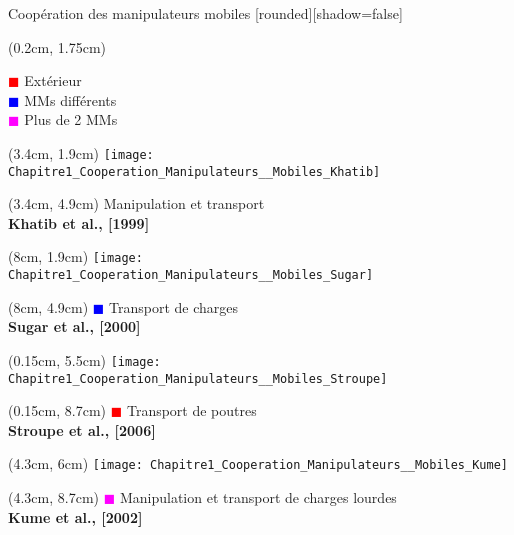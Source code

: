 \documentclass[french]{beamer}
\begin{document}
\begin{frame}{Coopération des manipulateurs mobiles}
[rounded][shadow=false]
{\scriptsize 
\begin{textblock*}{3cm}(0.2cm, 1.75cm) %
\begin{block}{} %
\textcolor{red}{$\blacksquare$} Extérieur\\
\textcolor{blue}{$\blacksquare$} MMs différents\\
\textcolor{magenta}{$\blacksquare$} Plus de 2 MMs
 \end{block}
\end{textblock*}
}
\begin{textblock*}{3.75cm}(3.4cm, 1.9cm)
\centering
\texttt{[image: Chapitre1\_Cooperation\_Manipulateurs\_\_Mobiles\_Khatib]}
\end{textblock*}
\begin{textblock*}{3.75cm}(3.4cm, 4.9cm) %
\centering
\tiny{Manipulation et transport}\\
\tiny{\textbf{Khatib et al., [1999]}}\\
\end{textblock*}

\begin{textblock*}{4.25cm}(8cm, 1.9cm) %
\centering
\texttt{[image: Chapitre1\_Cooperation\_Manipulateurs\_\_Mobiles\_Sugar]}
\end{textblock*}
\begin{textblock*}{4cm}(8cm, 4.9cm)
\centering
\tiny{\textcolor{blue}{$\blacksquare$} Transport de charges}\\
\tiny{\textbf{Sugar et al., [2000]}}\\
\end{textblock*}

\begin{textblock*}{4.1cm}(0.15cm, 5.5cm)
\centering
\texttt{[image: Chapitre1\_Cooperation\_Manipulateurs\_\_Mobiles\_Stroupe]}
\end{textblock*}
\begin{textblock*}{4.1cm}(0.15cm, 8.7cm)
\centering
\tiny{\textcolor{red}{$\blacksquare$} Transport de poutres}\\ 
\tiny{\textbf{Stroupe et al., [2006]}}\\
\end{textblock*}

\begin{textblock*}{4.5cm}(4.3cm, 6cm)
\centering
\texttt{[image: Chapitre1\_Cooperation\_Manipulateurs\_\_Mobiles\_Kume]}
\end{textblock*}
\begin{textblock*}{4.5cm}(4.3cm, 8.7cm)
\centering
\tiny{\textcolor{magenta}{$\blacksquare$} Manipulation et transport de charges lourdes}\\
\tiny{\textbf{Kume et al., [2002]}}\\
\end{textblock*}


\end{frame}
\end{document}
